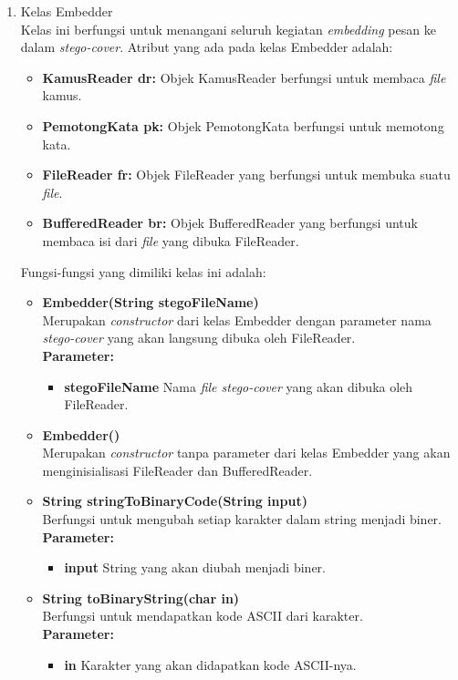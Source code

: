 \begin{enumerate}
	\item Kelas Embedder\\
	Kelas ini berfungsi untuk menangani seluruh kegiatan \textit{embedding} pesan ke dalam \textit{stego-cover}. Atribut yang ada pada kelas Embedder adalah:
	\begin{itemize}
		\item \textbf{KamusReader dr:} Objek KamusReader berfungsi untuk membaca \textit{file} kamus.
		\item \textbf{PemotongKata pk:} Objek PemotongKata berfungsi untuk memotong kata.
		\item \textbf{FileReader fr:} Objek FileReader yang berfungsi untuk membuka suatu \textit{file}.
		\item \textbf{BufferedReader br:} Objek BufferedReader yang berfungsi untuk membaca isi dari \textit{file} yang dibuka FileReader.
	\end{itemize}
	
	Fungsi-fungsi yang dimiliki kelas ini adalah:
	
	\begin{itemize}
		\item \textbf{Embedder(String stegoFileName)}\\
		Merupakan \textit{constructor} dari kelas Embedder dengan parameter nama \textit{stego-cover} yang akan langsung dibuka oleh FileReader.\\
		\textbf{Parameter:}
		\begin{itemize}
			\item \textbf{stegoFileName} Nama \textit{file stego-cover} yang akan dibuka oleh FileReader.
		\end{itemize}
		
		\item \textbf{Embedder()}\\
		Merupakan \textit{constructor} tanpa parameter dari kelas Embedder yang akan menginisialisasi FileReader dan BufferedReader.
		
		\item \textbf{String stringToBinaryCode(String input)}\\
		Berfungsi untuk mengubah setiap karakter dalam string menjadi biner.\\
		\textbf{Parameter:}
		\begin{itemize}
			\item \textbf{input} String yang akan diubah menjadi biner.
		\end{itemize}
		
		\item \textbf{String toBinaryString(char in)}\\
		Berfungsi untuk mendapatkan kode ASCII dari karakter.\\
		\textbf{Parameter:}
		\begin{itemize}
			\item \textbf{in} Karakter yang akan didapatkan kode ASCII-nya.
		\end{itemize}
		

\end{itemize}
\end{enumerate}
